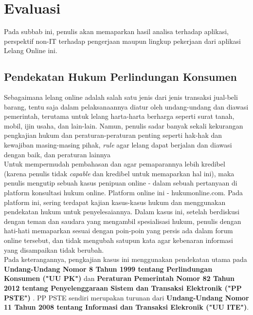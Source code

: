 \section{Evaluasi}
	Pada subbab ini, penulis akan memaparkan hasil analisa terhadap aplikasi, perspektif non-IT terhadap pengerjaan maupun lingkup pekerjaan dari aplikasi Lelang Online ini.
		
	\subsection{Pendekatan Hukum Perlindungan Konsumen}
	
	Sebagaimana lelang online adalah salah satu jenis dari jenis transaksi jual-beli barang, tentu saja dalam pelaksanaannya diatur oleh undang-undang dan diawasi pemerintah, terutama untuk lelang harta-harta berharga seperti surat tanah, mobil, ijin usaha, dan lain-lain. Namun, penulis sadar banyak sekali kekurangan pengkajian hukum dan peraturan-peraturan penting seperti hak-hak dan kewajiban masing-masing pihak, \textit{rule} agar lelang dapat berjalan dan diawasi dengan baik, dan peraturan lainnya\\
	Untuk mempermudah pembahasan dan agar pemaparannya lebih kredibel (karena penulis tidak \textit{capable} dan kredibel untuk memaparkan hal ini), maka penulis mengutip sebuah kasus penipuan online - dalam sebuah pertanyaan di platform konsultasi hukum online. Platform online ini - hukumonline.com. Pada platform ini, sering terdapat kajian kasus-kasus hukum dan menggunakan pendekatan hukum untuk penyelesaiannya. Dalam kasus ini, setelah berdiskusi dengan teman dan saudara yang mengambil spesialisasi hukum, penulis dengan hati-hati memaparkan sesuai dengan poin-poin yang persis ada dalam forum online tersebut, dan tidak mengubah satupun kata agar kebenaran informasi yang disampaikan tidak berubah.\\
	\indent Pada keterangannya, pengkajian kasus ini menggunakan pendekatan utama pada \textbf{Undang-Undang Nomor 8 Tahun 1999 tentang Perlindungan Konsumen ("UU PK") } dan \textbf{Peraturan Pemerintah Nomor 82 Tahun 2012 tentang Penyelenggaraan Sistem dan Transaksi Elektronik ("PP PSTE") }. PP PSTE sendiri merupakan turunan dari \textbf{Undang-Undang Nomor 11 Tahun 2008 tentang Informasi dan Transaksi Elekronik ("UU ITE")}.
	
			
	
